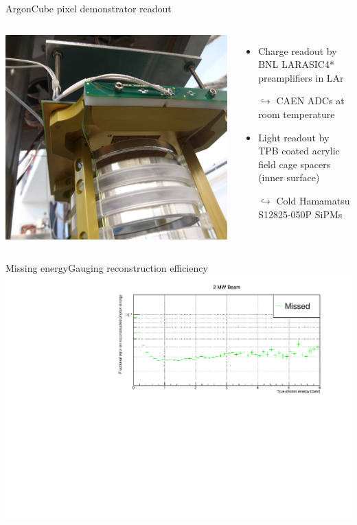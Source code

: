 \documentclass[]{beamer}
\newcommand*{\emphcol}{red}
\newcommand*{\AC}{{ArgonCube}}
\begin{document}
\begin{frame}{\AC{} pixel demonstrator readout}
	\begin{columns}[c]
		\centering
		\includegraphics[width=\textwidth]{viper/viper_sipm}
		\begin{itemize}
			\item {\color{\emphcol} Charge readout by BNL LARASIC4* preamplifiers in LAr}
			\item[$\hookrightarrow$] CAEN ADCs at room temperature
			\item Light readout by TPB coated acrylic field cage spacers (inner surface)
			\item[$\hookrightarrow$] {\color{\emphcol} Cold Hamamatsu S12825-050P SiPMs}
		\end{itemize}
	\end{columns}
\end{frame}

\begin{frame}{Missing energy}{Gauging reconstruction efficiency}
	\centering
	\includegraphics[width=\textwidth]{pile-up/2MW/missed_rel_x}
\end{frame}
\end{document}
